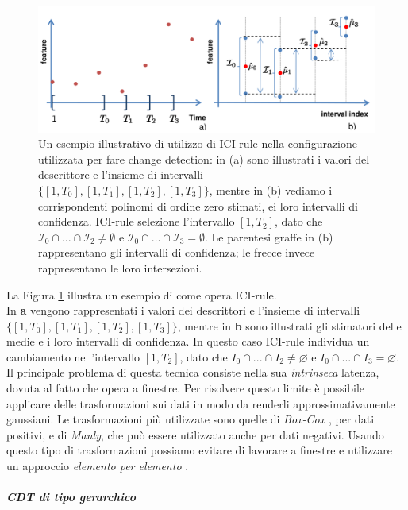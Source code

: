 \begin{figure}
	\centering
	\includegraphics[width=12cm,keepaspectratio]{pictures/ICIrule}
	\caption[Esempio di come opera la regola dell'intersezione degli intervalli di confidenza (ICI-rule)]{Un esempio illustrativo di utilizzo di ICI-rule nella configurazione utilizzata per fare change detection: in (a) sono illustrati i valori del descrittore e l'insieme di intervalli $\{[1,T_0],[1,T_1],[1,T_2],[1,T_3]\}$, mentre in (b) vediamo i corrispondenti polinomi di ordine zero stimati, ei loro intervalli di confidenza. ICI-rule selezione l'intervallo $[1,T_2]$, dato che $\mathcal{I}_0\cap\dots\cap\mathcal{I}_2\neq\emptyset$ e $\mathcal{I}_0\cap\dots\cap\mathcal{I}_3=\emptyset$. Le parentesi graffe in (b) rappresentano gli intervalli di confidenza; le frecce invece rappresentano le loro intersezioni.}
	\label{fig:ICIrule}
\end{figure}
La Figura \ref{fig:ICIrule} illustra un esempio di come opera ICI-rule.\\
In \textbf{a} vengono rappresentati i valori dei descrittori e l'insieme di intervalli $\{[1,T_0], [1,T_1], [1,T_2], [1,T_3]\}$, mentre in \textbf{b} sono illustrati gli stimatori delle medie e i loro intervalli di confidenza. In questo caso ICI-rule individua un cambiamento nell'intervallo $[1,T_2]$, dato che $I_0 \cap ...\cap I_2 \neq \varnothing$ e $I_0 \cap ...\cap I_3 = \varnothing$.\\
Il principale problema di questa tecnica consiste nella sua \textit{intrinseca} latenza, dovuta al fatto che opera a finestre. 
Per risolvere questo limite \`e possibile applicare delle trasformazioni sui dati in modo da renderli approssimativamente gaussiani. Le trasformazioni pi\`u utilizzate sono quelle di \textit{Box-Cox}   \cite{box1964analysis}, per dati positivi, e di \textit{Manly}, \cite{manly1976exponential} che pu\`o essere utilizzato anche per dati negativi. Usando questo tipo di trasformazioni possiamo evitare di lavorare a finestre e utilizzare un approccio \textit{elemento  per elemento} \cite{boracchi2014reconfigurable}.           
\subparagraph{CDT di tipo gerarchico} 
